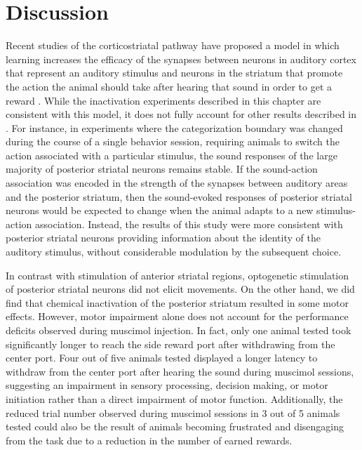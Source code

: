\section{Discussion}

Recent studies of the corticostriatal pathway have proposed a model in which learning increases the efficacy of the synapses between neurons in auditory cortex that represent an auditory stimulus and neurons in the striatum that promote the action the animal should take after hearing that sound in order to get a reward \citep{Znamenskiy2013, Xiong2015}.
%
While the inactivation experiments described in this chapter are consistent with this model,  it does not fully account for other results described in \citet{Guo2018}.
%
For instance, in experiments where the categorization boundary was changed during the course of a single behavior session, requiring animals to switch the action associated with a particular stimulus, the sound responses of the large majority of posterior striatal neurons remains stable. 
%
If the sound-action association was encoded in the strength of the synapses between auditory areas and the posterior striatum, then the sound-evoked responses of posterior striatal neurons would be expected to change when the animal adapts to a new stimulus-action association.
%
Instead, the results of this study were more consistent with posterior striatal neurons providing information about the identity of the auditory stimulus, without considerable modulation by the subsequent choice. 

In contrast with stimulation of anterior striatal regions, optogenetic stimulation of posterior striatal neurons did not elicit movements. 
%
On the other hand, we did find that chemical inactivation of the posterior striatum resulted in some motor effects.
%
However, motor impairment alone does not account for the performance deficits
observed during muscimol injection.
%
In fact, only one animal tested took significantly longer to reach the side
reward port after withdrawing from the center port.
%
Four out of five animals tested displayed a longer latency to withdraw from the center port
after hearing the sound during muscimol sessions, suggesting an impairment in sensory processing, decision making, or motor initiation rather than a direct impairment of motor function. 
%
Additionally, the reduced trial number observed during muscimol sessions in 3 out of 5 animals tested could also be the result of animals becoming frustrated and disengaging from the task due to a reduction in the number of earned rewards.

